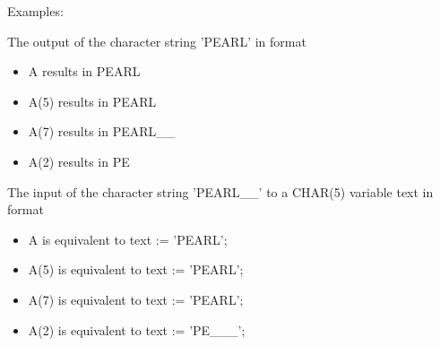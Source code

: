 Examples:

The output of the character string 'PEARL' in format

\begin{itemize}
\item A    results in PEARL 
\item A(5) results in PEARL 
\item A(7) results in PEARL\_\_ 
\item A(2) results in PE
\end{itemize}

The input of the character string 'PEARL\_\_' to a CHAR(5) variable text in
format

\begin{itemize}
\item A is equivalent to text := 'PEARL';
\item A(5) is equivalent to text := 'PEARL';
\item A(7) is equivalent to text := 'PEARL';
\item A(2) is equivalent to text := 'PE\_\_\_';
\end{itemize}



